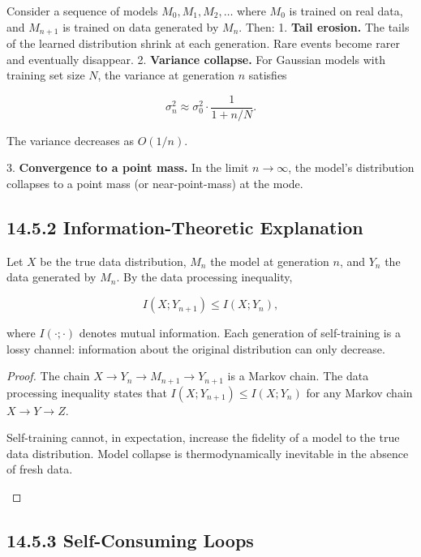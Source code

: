 \begin{theorem}[Shumailov et al., 2024]
Consider a sequence of models $M_0, M_1, M_2, \ldots$ where $M_0$ is trained on real data, and $M_{n+1}$ is trained on data generated by $M_n$. Then:
1. \textbf{Tail erosion.} The tails of the learned distribution shrink at each generation. Rare events become rarer and eventually disappear.
2. \textbf{Variance collapse.} For Gaussian models with training set size $N$, the variance at generation $n$ satisfies

\[\sigma_n^2 \approx \sigma_0^2 \cdot \frac{1}{1 + n/N}.\]

The variance decreases as $O(1/n)$.

3. \textbf{Convergence to a point mass.} In the limit $n \to \infty$, the model's distribution collapses to a point mass (or near-point-mass) at the mode.
\end{theorem}

\subsection{14.5.2 Information-Theoretic Explanation}

\begin{proposition}
Let $X$ be the true data distribution, $M_n$ the model at generation $n$, and $Y_n$ the data generated by $M_n$. By the data processing inequality,

\[I(X; Y_{n+1}) \leq I(X; Y_n),\]

where $I(\cdot; \cdot)$ denotes mutual information. Each generation of self-training is a lossy channel: information about the original distribution can only decrease.


\end{proposition}

\begin{proof}
The chain $X \to Y_n \to M_{n+1} \to Y_{n+1}$ is a Markov chain. The data processing inequality states that $I(X; Y_{n+1}) \leq I(X; Y_n)$ for any Markov chain $X \to Y \to Z$. 

\begin{corollary}
Self-training cannot, in expectation, increase the fidelity of a model to the true data distribution. Model collapse is thermodynamically inevitable in the absence of fresh data.
\end{corollary}

\end{proof}

\subsection{14.5.3 Self-Consuming Loops}

